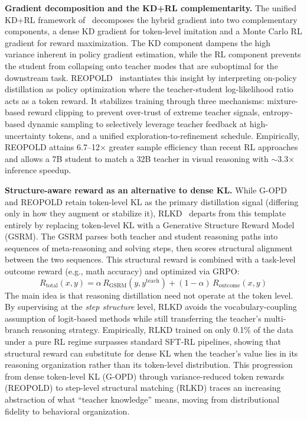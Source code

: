 \documentclass{article} %
\begin{document}
\textbf{Gradient decomposition and the KD+RL complementarity.} The unified KD+RL framework of~\citet{2512.23097} decomposes the hybrid gradient into two complementary components, a dense KD gradient for token-level imitation and a Monte Carlo RL gradient for reward maximization. The KD component dampens the high variance inherent in policy gradient estimation, while the RL component prevents the student from collapsing onto teacher modes that are suboptimal for the downstream task. REOPOLD~\citep{2603.11137} instantiates this insight by interpreting on-policy distillation as policy optimization where the teacher-student log-likelihood ratio acts as a token reward. It stabilizes training through three mechanisms: mixture-based reward clipping to prevent over-trust of extreme teacher signals, entropy-based dynamic sampling to selectively leverage teacher feedback at high-uncertainty tokens, and a unified exploration-to-refinement schedule. Empirically, REOPOLD attains 6.7--12$\times$ greater sample efficiency than recent RL approaches and allows a 7B student to match a 32B teacher in visual reasoning with $\sim$3.3$\times$ inference speedup.

\textbf{Structure-aware reward as an alternative to dense KL.} While G-OPD and REOPOLD retain token-level KL as the primary distillation signal (differing only in how they augment or stabilize it), RLKD~\citep{2505.16142} departs from this template entirely by replacing token-level KL with a Generative Structure Reward Model (GSRM). The GSRM parses both teacher and student reasoning paths into sequences of meta-reasoning and solving steps, then scores structural alignment between the two sequences. This structural reward is combined with a task-level outcome reward (e.g., math accuracy) and optimized via GRPO:
\begin{equation}
    R_{\text{total}}(x, y) = \alpha \, R_{\text{GSRM}}(y, y^{\text{teach}}) + (1-\alpha) \, R_{\text{outcome}}(x, y)
\end{equation}
The main idea is that reasoning distillation need not operate at the token level. By supervising at the \emph{step structure} level, RLKD avoids the vocabulary-coupling assumption of logit-based methods while still transferring the teacher's multi-branch reasoning strategy. Empirically, RLKD trained on only 0.1\% of the data under a pure RL regime surpasses standard SFT-RL pipelines, showing that structural reward can substitute for dense KL when the teacher's value lies in its reasoning organization rather than its token-level distribution. This progression from dense token-level KL (G-OPD) through variance-reduced token rewards (REOPOLD) to step-level structural matching (RLKD) traces an increasing abstraction of what ``teacher knowledge'' means, moving from distributional fidelity to behavioral organization.
\end{document}
